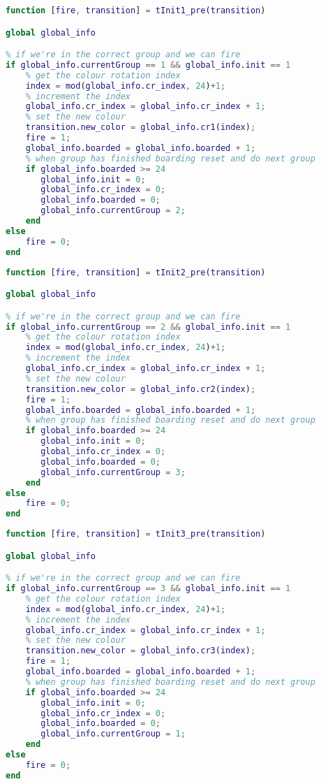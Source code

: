 \begin{lstlisting}[language=MATLAB, caption=tInit1\_pre.m]
function [fire, transition] = tInit1_pre(transition)

global global_info

% if we're in the correct group and we can fire
if global_info.currentGroup == 1 && global_info.init == 1
    % get the colour rotation index
    index = mod(global_info.cr_index, 24)+1;
    % increment the index
    global_info.cr_index = global_info.cr_index + 1;
    % set the new colour
    transition.new_color = global_info.cr1(index);
    fire = 1;
    global_info.boarded = global_info.boarded + 1;
    % when group has finished boarding reset and do next group
    if global_info.boarded >= 24
       global_info.init = 0;
       global_info.cr_index = 0;
       global_info.boarded = 0;
       global_info.currentGroup = 2;  
    end
else
    fire = 0;
end
\end{lstlisting}

\begin{lstlisting}[language=MATLAB, caption=tInit2\_pre.m]
function [fire, transition] = tInit2_pre(transition)

global global_info

% if we're in the correct group and we can fire
if global_info.currentGroup == 2 && global_info.init == 1
    % get the colour rotation index
    index = mod(global_info.cr_index, 24)+1;
    % increment the index
    global_info.cr_index = global_info.cr_index + 1;
    % set the new colour
    transition.new_color = global_info.cr2(index);
    fire = 1;
    global_info.boarded = global_info.boarded + 1;
    % when group has finished boarding reset and do next group
    if global_info.boarded >= 24
       global_info.init = 0;
       global_info.cr_index = 0;
       global_info.boarded = 0;
       global_info.currentGroup = 3;  
    end
else
    fire = 0;
end
\end{lstlisting}

\begin{lstlisting}[language=MATLAB, caption=tInit3\_pre.m]
function [fire, transition] = tInit3_pre(transition)

global global_info

% if we're in the correct group and we can fire
if global_info.currentGroup == 3 && global_info.init == 1
    % get the colour rotation index
    index = mod(global_info.cr_index, 24)+1;
    % increment the index
    global_info.cr_index = global_info.cr_index + 1;
    % set the new colour
    transition.new_color = global_info.cr3(index);
    fire = 1;
    global_info.boarded = global_info.boarded + 1;
    % when group has finished boarding reset and do next group
    if global_info.boarded >= 24
       global_info.init = 0;
       global_info.cr_index = 0;
       global_info.boarded = 0;
       global_info.currentGroup = 1;  
    end
else
    fire = 0;
end
\end{lstlisting}



